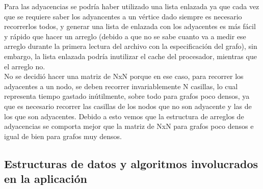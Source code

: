 \documentclass[a4paper,10pt]{article}
\begin{document}
  \indent Para las adyacencias se podr\'ia haber utilizado una lista enlazada ya
  que cada vez que se requiere saber los adyancentes a un vértice dado
  siempre es necesario recorrerlos todos, y generar una lista de
  enlazada con los adyacentes es m\'as f\'acil y r\'apido que hacer un
  arreglo (debido a que no se sabe cuanto va a medir
  ese arreglo durante la primera lectura del archivo con la
  especificaci\'on del grafo), sin embargo, la lista enlazada podr\'ia
  inutilizar el cache del procesador, mientras que el arreglo no.\\

  \indent No se decidi\'o hacer una matriz de NxN porque en ese caso, para recorrer los
  adyacentes a un nodo, se deben recorrer invariablemente N casillas, lo
  cual representa tiempo gastado in\'utilmente, sobre todo para grafos
  poco densos, ya que es necesario recorrer las casillas de los nodos que
  no son adyacente y las de los que son adyacentes. Debido a esto vemos
  que la estructura de arreglos de adyacencias se comporta mejor que la
  matriz de NxN para grafos poco densos e igual de bien para grafos muy
  densos.

\subsection{Estructuras de datos y algoritmos involucrados en la aplicación}
\end{document}

